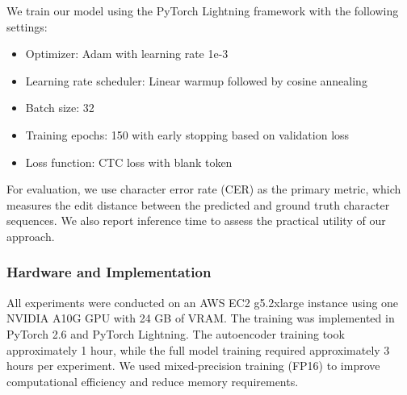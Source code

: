 We train our model using the PyTorch Lightning framework with the following settings:
\begin{itemize}
    \item Optimizer: Adam with learning rate 1e-3
    \item Learning rate scheduler: Linear warmup followed by cosine annealing
    \item Batch size: 32
    \item Training epochs: 150 with early stopping based on validation loss
    \item Loss function: CTC loss with blank token
\end{itemize}

For evaluation, we use character error rate (CER) as the primary metric, which measures the edit distance between the predicted and ground truth character sequences. We also report inference time to assess the practical utility of our approach.

\subsubsection{Hardware and Implementation}

All experiments were conducted on an AWS EC2 g5.2xlarge instance using one NVIDIA A10G GPU with 24 GB of VRAM. The training was implemented in PyTorch 2.6 and PyTorch Lightning. The autoencoder training took approximately 1 hour, while the full model training required approximately 3 hours per experiment. We used mixed-precision training (FP16) to improve computational efficiency and reduce memory requirements.
